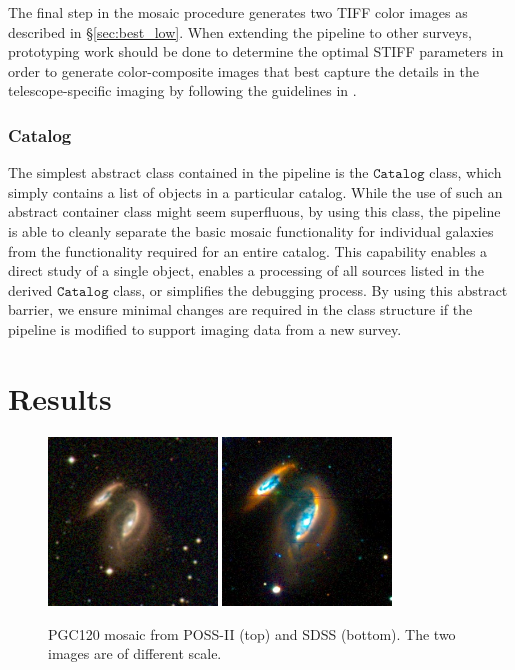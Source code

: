 \documentclass[authoryear, 12pt, 5p, times]{elsarticle}
\begin{document}
The final step in the mosaic procedure generates two TIFF color images as described in \S\ref{sec:best_low}.  When extending the pipeline to other surveys, prototyping work should be done to determine the optimal STIFF parameters in order to generate color-composite images that best capture the details in the telescope-specific imaging by following the guidelines in \citet{stiff}.

\subsubsection{Catalog}

The simplest abstract class contained in the pipeline is the $\texttt{Catalog}$ class, which simply contains a list of objects in a particular catalog. While the use of such an abstract container class might seem superfluous, by using this class, the pipeline is able to cleanly separate the basic mosaic functionality for individual galaxies from the functionality required for an entire catalog. This capability enables a direct study of a single object, enables a processing of all sources listed in the derived $\texttt{Catalog}$ class, or simplifies the debugging process. By using this abstract barrier, we ensure minimal changes are required in the class structure if the pipeline is modified to support imaging data from a new survey.

\section{Results\label{results-sec}}

\begin{figure}[h]
\centering
\includegraphics[width=0.4\textwidth]{figures/DSS_120_BEST}
\includegraphics[width=0.4\textwidth]{figures/SDSS_120_LOW}	
\caption{PGC120 mosaic from POSS-II (top) and SDSS (bottom). The two images are of different scale.}
\label{fig:comparison}
\end{figure}
\end{document}
